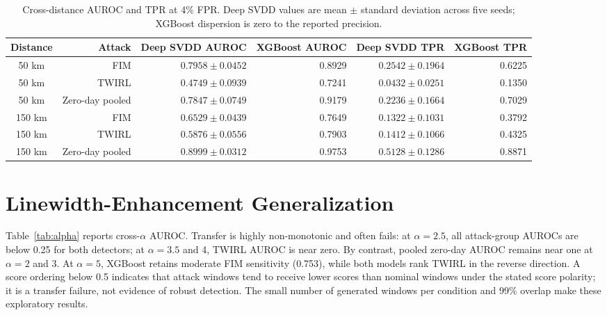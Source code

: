 \documentclass[12pt, a4paper]{report}
\begin{document}
\begin{table}[ht]
\centering
\small
\caption{Cross-distance AUROC and TPR at 4\% FPR. Deep SVDD values are mean $\pm$ standard deviation across five seeds; XGBoost dispersion is zero to the reported precision.}
\label{tab:distance}
\begin{tabular}{crrrrr}
\toprule
Distance & Attack & Deep SVDD AUROC & XGBoost AUROC & Deep SVDD TPR & XGBoost TPR \\
\midrule
50 km & FIM & $0.7958\pm0.0452$ & 0.8929 & $0.2542\pm0.1964$ & 0.6225 \\
50 km & TWIRL & $0.4749\pm0.0939$ & 0.7241 & $0.0432\pm0.0251$ & 0.1350 \\
50 km & Zero-day pooled & $0.7847\pm0.0749$ & 0.9179 & $0.2236\pm0.1664$ & 0.7029 \\
150 km & FIM & $0.6529\pm0.0439$ & 0.7649 & $0.1322\pm0.1031$ & 0.3792 \\
150 km & TWIRL & $0.5876\pm0.0556$ & 0.7903 & $0.1412\pm0.1066$ & 0.4325 \\
150 km & Zero-day pooled & $0.8999\pm0.0312$ & 0.9753 & $0.5128\pm0.1286$ & 0.8871 \\
\bottomrule
\end{tabular}
\end{table}

\chapter{Linewidth-Enhancement Generalization}\label{ch:alpha}
Table~\ref{tab:alpha} reports cross-$\alpha$ AUROC. Transfer is highly non-monotonic and often fails: at $\alpha=2.5$, all attack-group AUROCs are below 0.25 for both detectors; at $\alpha=3.5$ and 4, TWIRL AUROC is near zero. By contrast, pooled zero-day AUROC remains near one at $\alpha=2$ and 3. At $\alpha=5$, XGBoost retains moderate FIM sensitivity (0.753), while both models rank TWIRL in the reverse direction. A score ordering below 0.5 indicates that attack windows tend to receive lower scores than nominal windows under the stated score polarity; it is a transfer failure, not evidence of robust detection. The small number of generated windows per condition and 99\% overlap make these exploratory results.
\end{document}
